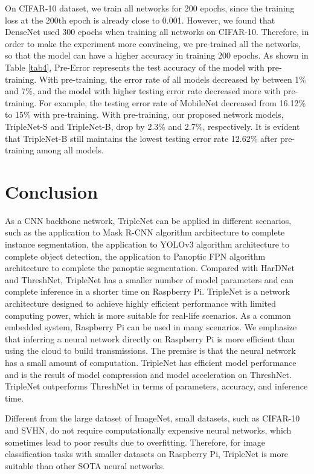 \documentclass[default,iicol]{sn-jnl}
\theoremstyle{thmstyleone}\newtheorem{theorem}{Theorem}\newtheorem{proposition}[theorem]{Proposition}
\theoremstyle{thmstyletwo}\newtheorem{example}{Example}\newtheorem{remark}{Remark}
\theoremstyle{thmstylethree}\newtheorem{definition}{Definition}
\begin{document}
On CIFAR-10 dataset, we train all networks for 200 epochs, since the training loss at the 200th epoch is already close to 0.001. However, we found that DenseNet \cite{huang2017densely} used 300 epochs when training all networks on CIFAR-10. Therefore, in order to make the experiment more convincing, we pre-trained all the networks, so that the model can have a higher accuracy in training 200 epochs. As shown in Table \ref{tab4}, Pre-Error represents the test accuracy of the model with pre-training. With pre-training, the error rate of all models decreased by between 1\% and 7\%, and the model with higher testing error rate decreased more with pre-training. For example, the testing error rate of MobileNet decreased from 16.12\% to 15\% with pre-training. With pre-training, our proposed network models, TripleNet-S and TripleNet-B, drop by 2.3\% and 2.7\%, respectively. It is evident that TripleNet-B still maintains the lowest testing error rate 12.62\% after pre-training among all models.

\section{Conclusion}
As a CNN backbone network, TripleNet can be applied in different scenarios, such as the application to Mask R-CNN \cite{he2017mask} algorithm architecture to complete instance segmentation, the application to YOLOv3 \cite{redmon2018yolov3} algorithm architecture to complete object detection, the application to Panoptic FPN \cite{kirillov2019panoptic} algorithm architecture to complete the panoptic segmentation. Compared with HarDNet and ThreshNet, TripleNet has a smaller number of model parameters and can complete inference in a shorter time on Raspberry Pi. TripleNet is a network architecture designed to achieve highly efficient performance with limited computing power, which is more suitable for real-life scenarios.
As a common embedded system, Raspberry Pi can be used in many scenarios. We emphasize that inferring a neural network directly on Raspberry Pi is more efficient than using the cloud to build transmissions. The premise is that the neural network has a small amount of computation. TripleNet has efficient model performance and is the result of model compression and model acceleration on ThreshNet. TripleNet outperforms ThreshNet in terms of parameters, accuracy, and inference time.

Different from the large dataset of ImageNet, small datasets, such as CIFAR-10 and SVHN, do not require computationally expensive neural networks, which sometimes lead to poor results due to overfitting. Therefore, for image classification tasks with smaller datasets on Raspberry Pi, TripleNet is more suitable than other SOTA neural networks.
\end{document}
